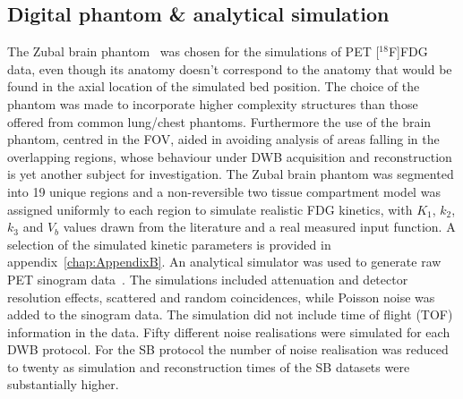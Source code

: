 \subsection*{Digital phantom \& analytical simulation}
The Zubal brain phantom~\cite{Zubal1994} was chosen for the simulations of PET [$^{18}$F]FDG data, even though its anatomy doesn't correspond to the anatomy that would be found in the axial location of the simulated bed position. The choice of the phantom was made to incorporate higher complexity structures than those offered from common lung/chest phantoms. Furthermore the use of the brain phantom, centred in the FOV, aided in avoiding analysis of areas falling in the overlapping regions, whose behaviour under DWB acquisition and reconstruction is yet another subject for investigation. The Zubal brain phantom was segmented into 19 unique regions and a non-reversible two tissue compartment model was assigned uniformly to each region to simulate realistic FDG kinetics, with $K_1$, $k_2$, $k_3$ and $V_b$ values drawn from the literature and a real measured input function. A selection of the simulated kinetic parameters is provided in appendix~\ref{chap:AppendixB}.
An analytical simulator was used to generate raw PET sinogram data~\cite{Stute2015}. The simulations included attenuation and detector resolution effects, scattered and random coincidences, while Poisson noise was added to the sinogram data. %
The simulation did not include time of flight (TOF) information in the data. Fifty different noise realisations were simulated for each DWB protocol. For the SB protocol the number of noise realisation was reduced to twenty as simulation and reconstruction times of the SB datasets were substantially higher.

